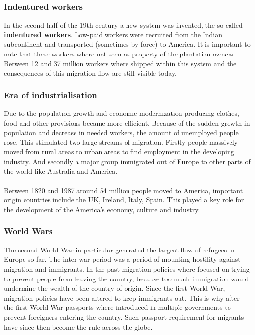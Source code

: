 \documentclass[../summary.tex]{subfiles}
\begin{document}
	\subsubsection{Indentured workers}
	In the second half of the 19th century a new system was invented, the so-called \textbf{indentured workers}. Low-paid workers were recruited from the Indian subcontinent and transported (sometimes by force) to America. It is important to note that these workers where not seen as property of the plantation owners. Between 12 and 37 million  workers where shipped within this system and the consequences of this migration flow are still visible today.
	
	\subsubsection{Era of industrialisation}
	Due to the population growth and economic modernization producing clothes, food and other provisions became more efficient. Because of the sudden growth in population and decrease in needed workers, the amount of unemployed people rose. This stimulated two large streams of migration. Firstly people massively moved from rural areas to urban areas to find employment in the developing industry.  And secondly a major group immigrated out of Europe to other parts of the world like Australia and America. 
	\\
	\\
	Between 1820 and 1987 around 54 million people moved to America, important origin countries include the UK, Ireland, Italy, Spain. This played a key role for the development of the America's economy, culture and industry. 
	\newpage
	
	\subsubsection{World Wars}
	The second World War in particular generated the largest flow of refugees in Europe so far. The inter-war period was a period of mounting hostility against migration and immigrants. In the past migration policies where focused on trying to prevent people from leaving the country, because too much immigration would undermine the wealth of the country of origin. Since the first World War, migration policies have been altered to keep immigrants out. This is why after the first World War passports where introduced in multiple governments to prevent foreigners entering the country. Such passport requirement for migrants have since then become the rule across the globe.
	
\end{document}
